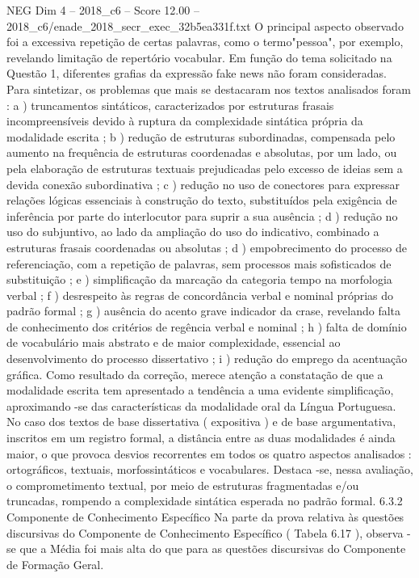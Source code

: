 \begin{textsample}{NEG Dim 4 – 2018\_c6 – Score 12.00 – 2018\_c6/enade\_2018\_secr\_exec\_32b5ea331f.txt}
O principal aspecto observado foi a excessiva repetição de certas palavras, como o termo"pessoa", por exemplo, revelando limitação de repertório vocabular.
Em função do tema solicitado na Questão 1, diferentes grafias da expressão fake news não foram consideradas.
Para sintetizar, os problemas que mais se destacaram nos textos analisados foram : a ) truncamentos sintáticos, caracterizados por estruturas frasais incompreensíveis devido à ruptura da complexidade sintática própria da modalidade escrita ; b ) redução de estruturas subordinadas, compensada pelo aumento na frequência de estruturas coordenadas e absolutas, por um lado, ou pela elaboração de estruturas textuais prejudicadas pelo excesso de ideias sem a devida conexão subordinativa ; c ) redução no uso de conectores para expressar relações lógicas essenciais à construção do texto, substituídos pela exigência de inferência por parte do interlocutor para suprir a sua ausência ; d ) redução no uso do subjuntivo, ao lado da ampliação do uso do indicativo, combinado a estruturas frasais coordenadas ou absolutas ; d ) empobrecimento do processo de referenciação, com a repetição de palavras, sem processos mais sofisticados de substituição ; e ) simplificação da marcação da categoria tempo na morfologia verbal ; f ) desrespeito às regras de concordância verbal e nominal próprias do padrão formal ; g ) ausência do acento grave indicador da crase, revelando falta de conhecimento dos critérios de regência verbal e nominal ; h ) falta de domínio de vocabulário mais abstrato e de maior complexidade, essencial ao desenvolvimento do processo dissertativo ; i ) redução do emprego da acentuação gráfica.
Como resultado da correção, merece atenção a constatação de que a modalidade escrita tem apresentado a tendência a uma evidente simplificação, aproximando -se das características da modalidade oral da Língua Portuguesa.
No caso dos textos de base dissertativa ( expositiva ) e de base argumentativa, inscritos em um registro formal, a distância entre as duas modalidades é ainda maior, o que provoca desvios recorrentes em todos os quatro aspectos analisados : ortográficos, textuais, morfossintáticos e vocabulares.
Destaca -se, nessa avaliação, o comprometimento textual, por meio de estruturas fragmentadas e/ou truncadas, rompendo a complexidade sintática esperada no padrão formal. 6.3.2 Componente de Conhecimento Específico Na parte da prova relativa às questões discursivas do Componente de Conhecimento Específico ( Tabela 6.17 ), observa -se que a Média foi mais alta do que para as questões discursivas do Componente de Formação Geral.

\end{textsample}
